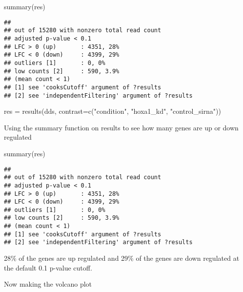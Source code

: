 \documentclass[
]{article}
\newenvironment{Shaded}{\begin{snugshade}}{\end{snugshade}}
\newcommand{\AttributeTok}[1]{\textcolor[rgb]{0.77,0.63,0.00}{#1}}
\newcommand{\FunctionTok}[1]{\textcolor[rgb]{0.00,0.00,0.00}{#1}}
\newcommand{\NormalTok}[1]{#1}
\newcommand{\OtherTok}[1]{\textcolor[rgb]{0.56,0.35,0.01}{#1}}
\newcommand{\SpecialCharTok}[1]{\textcolor[rgb]{0.00,0.00,0.00}{#1}}
\newcommand{\StringTok}[1]{\textcolor[rgb]{0.31,0.60,0.02}{#1}}
\begin{document}
\begin{Shaded}
\begin{Highlighting}[]
\FunctionTok{summary}\NormalTok{(res)}
\end{Highlighting}
\end{Shaded}

\begin{verbatim}
## 
## out of 15280 with nonzero total read count
## adjusted p-value < 0.1
## LFC > 0 (up)       : 4351, 28%
## LFC < 0 (down)     : 4399, 29%
## outliers [1]       : 0, 0%
## low counts [2]     : 590, 3.9%
## (mean count < 1)
## [1] see 'cooksCutoff' argument of ?results
## [2] see 'independentFiltering' argument of ?results
\end{verbatim}

\begin{Shaded}
\begin{Highlighting}[]
\NormalTok{res }\OtherTok{=} \FunctionTok{results}\NormalTok{(dds, }\AttributeTok{contrast=}\FunctionTok{c}\NormalTok{(}\StringTok{"condition"}\NormalTok{, }\StringTok{"hoxa1\_kd"}\NormalTok{, }\StringTok{"control\_sirna"}\NormalTok{))}
\end{Highlighting}
\end{Shaded}

Using the summary function on results to see how many genes are up or
down regulated

\begin{Shaded}
\begin{Highlighting}[]
\FunctionTok{summary}\NormalTok{(res)}
\end{Highlighting}
\end{Shaded}

\begin{verbatim}
## 
## out of 15280 with nonzero total read count
## adjusted p-value < 0.1
## LFC > 0 (up)       : 4351, 28%
## LFC < 0 (down)     : 4399, 29%
## outliers [1]       : 0, 0%
## low counts [2]     : 590, 3.9%
## (mean count < 1)
## [1] see 'cooksCutoff' argument of ?results
## [2] see 'independentFiltering' argument of ?results
\end{verbatim}

28\% of the genes are up regulated and 29\% of the genes are down
regulated at the default 0.1 p-value cutoff.

Now making the volcano plot

\begin{Shaded}
\end{Shaded}
\end{document}
